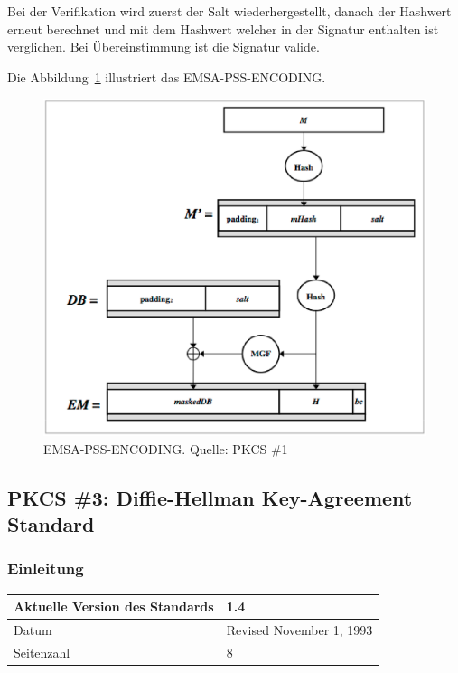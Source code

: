 \documentclass[10pt,a4paper]{article}
\begin{document}
Bei der Verifikation wird zuerst der Salt wiederhergestellt, danach der Hashwert erneut
berechnet und mit dem Hashwert welcher in der Signatur enthalten ist verglichen. Bei
Übereinstimmung ist die Signatur valide.

Die Abbildung~\ref{fig:emsa-pss-encoding} illustriert das EMSA-PSS-ENCODING.

\begin{figure}[ht]
    \centering
    \includegraphics[scale=0.48]{images/emsa-pss-encoding}
    \caption{EMSA-PSS-ENCODING. \small{Quelle: PKCS \#1}}
    \label{fig:emsa-pss-encoding}
\end{figure}

\FloatBarrier

\subsection{PKCS \#3: Diffie-Hellman Key-Agreement Standard}

\subsubsection{Einleitung}
\begin{table}[ht]
    \centering
    \begin{tabular}{|l|l|} \hline
        Aktuelle Version des Standards & 1.4 \\\hline
        Datum & Revised November 1, 1993 \\\hline
        Seitenzahl & 8 \\\hline
    \end{tabular}
\end{table}
\end{document}
